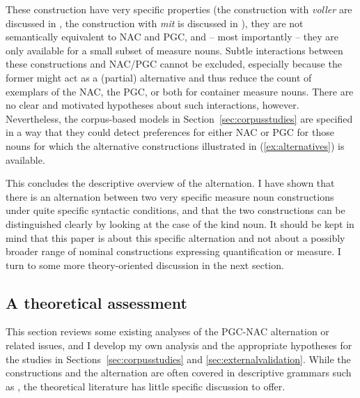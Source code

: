 \documentclass[USenglish]{article}
\begin{document}
These construction have very specific properties (the construction with \textit{voller} are discussed in \citealp{Zeldes2018}, the construction with \textit{mit} is discussed in \citealp{Bhatt1990}), they are not semantically equivalent to NAC and PGC, and -- most importantly -- they are only available for a small subset of measure nouns.
Subtle interactions between these constructions and NAC\slash PGC cannot be excluded, especially because the former might act as a (partial) alternative and thus reduce the count of exemplars of the NAC, the PGC, or both for container measure nouns.
There are no clear and motivated hypotheses about such interactions, however.
Nevertheless, the corpus-based models in Section~\ref{sec:corpusstudies} are specified in a way that they could detect preferences for either NAC or PGC for those nouns for which the alternative constructions illustrated in (\ref{ex:alternatives}) is available.

This concludes the descriptive overview of the alternation.
I have shown that there is an alternation between two very specific measure noun constructions under quite specific syntactic conditions, and that the two constructions can be distinguished clearly by looking at the case of the kind noun.
It should be kept in mind that this paper is about this specific alternation and not about a possibly broader range of nominal constructions expressing quantification or measure.
I turn to some more theory-oriented discussion in the next section.



\subsection{A theoretical assessment}
\label{sec:analyses}

This section reviews some existing analyses of the PGC-NAC alternation or related issues, and I develop my own analysis and the appropriate hypotheses for the studies in Sections~\ref{sec:corpusstudies} and \ref{sec:externalvalidation}.
While the constructions and the alternation are often covered in descriptive grammars such as \citet[XYZ]{Eisenberg2013a}, the theoretical literature has little specific discussion to offer.
\end{document}

